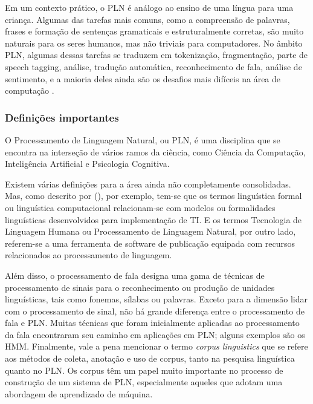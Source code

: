 \documentclass[
	12pt,				%
	openright,			%
	oneside,			%
	a4paper,			%
	english,			%
	spanish,			%
	brazil				%
	]{abntex2}
\begin{document}
	Em um contexto prático, o \gls{PLN} é análogo ao ensino de uma língua para uma criança. Algumas das tarefas mais comuns, como a compreensão de palavras, frases e formação de sentenças gramaticais e estruturalmente corretas, são muito naturais para os seres humanos, mas não triviais para computadores. No âmbito \gls{PLN}, algumas dessas tarefas se traduzem em tokenização, fragmentação, parte de speech tagging, análise, tradução automática, reconhecimento de fala, análise de sentimento, e a maioria deles ainda são os desafios mais difíceis na área de computação \cite{book_natlang_python}.
		
	\subsubsection*{Definições importantes}
	O Processamento de Linguagem Natural, ou \gls{PLN}, é uma disciplina que se encontra na interseção de vários ramos da ciência, como Ciência da Computação, Inteligência Artificial e Psicologia Cognitiva. 
	
Existem várias definições para a área ainda não completamente consolidadas. Mas, como descrito por   (\citeyear{book_natural_lang}), por exemplo, tem-se que os termos linguística formal ou linguística computacional relacionam-se com modelos ou formalidades linguísticas desenvolvidos para implementação de TI. E os termos Tecnologia de Linguagem Humana ou Processamento de Linguagem Natural, por outro lado, referem-se a uma ferramenta de software de publicação equipada com recursos relacionados ao processamento de linguagem. 

Além disso, o processamento de fala designa uma gama de técnicas de processamento de sinais para o reconhecimento ou produção de unidades linguísticas, tais como fonemas, sílabas ou palavras. Exceto para a dimensão lidar com o processamento de sinal, não há grande diferença entre o processamento de fala e \gls{PLN}. Muitas técnicas que foram inicialmente aplicadas ao processamento da fala encontraram seu caminho em aplicações em \gls{PLN}; alguns exemplos são os \gls{HMM}. Finalmente, vale a pena mencionar o termo \textit{corpus linguistics}  que se refere aos métodos de coleta, anotação e uso de corpus, tanto na pesquisa linguística quanto no \gls{PLN}. Os corpus têm um papel muito importante no processo de construção de um sistema de \gls{PLN}, especialmente aqueles que adotam uma abordagem de aprendizado de máquina.
\end{document}
